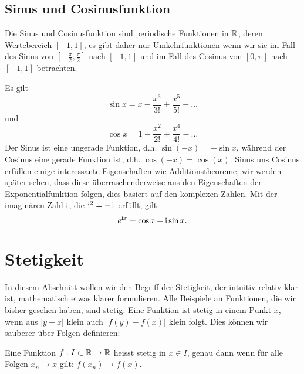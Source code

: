 \subsection{Sinus  und Cosinusfunktion}
\label{\detokenize{vorkurs/funktionen:sinus-und-cosinusfunktion}}
Die Sinus  und Cosinusfunktion sind periodische Funktionen in \(\mathbb{R}\), deren Wertebereich \([-1,1]\), es gibt daher nur Umkehrfunktionen wenn wir sie im Fall des Sinus von \([-\frac{\pi}2,\frac{\pi}2]\) nach \([-1,1]\) und im Fall des Cosinus von \([0,\pi]\) nach \([-1,1]\) betrachten.

Es gilt
\begin{equation*}
 \sin x = x - \frac{x^3}{3!} + \frac{x^5}{5!} - \ldots\end{equation*}
und
\begin{equation*}
\cos x = 1- \frac{x^2}{2!} + \frac{x^4}{4!} - \ldots\end{equation*}
Der Sinus ist eine ungerade Funktion, d.h. \(\sin (-x) = -  \sin x\), während der Cosinus eine gerade Funktion ist, d.h. \(\cos(-x) = \cos(x)\). Sinus uns Cosinus erfüllen einige interessante Eigenschaften wie Additionstheoreme, wir werden später sehen, dass diese überraschenderweise aus den Eigenschaften der Exponentialfunktion folgen, dies basiert auf den komplexen Zahlen. Mit der imaginären Zahl \(\mathrm{i}\), die \(\mathrm{i}^2 = -1\) erfüllt, gilt
\begin{equation*}
 e^{\mathrm{i} x}  = \cos x + \mathrm{i} \sin x.\end{equation*}

\section{Stetigkeit}
\label{\detokenize{vorkurs/stetigkeit:stetigkeit}}\label{\detokenize{vorkurs/stetigkeit::doc}}
In diesem Abschnitt wollen wir den Begriff der Stetigkeit, der intuitiv relativ klar ist, mathematisch etwas klarer formulieren. Alle Beispiele an Funktionen, die wir bisher gesehen haben, sind stetig. Eine Funktion ist stetig in einem Punkt \(x\), wenn aus \(|y-x|\) klein auch \(|f(y)-f(x)|\) klein folgt. Dies können wir sauberer über Folgen definieren:
\label{vorkurs/stetigkeit:definition-0}
\begin{definition}{}{}



Eine Funktion \(f: I \subset \mathbb{R} \rightarrow \mathbb{R}\) heisst stetig in \(x \in I\), genau dann wenn für alle Folgen \(x_n \rightarrow x\) gilt: \(f(x_n) \rightarrow f(x)\).
\end{definition}


